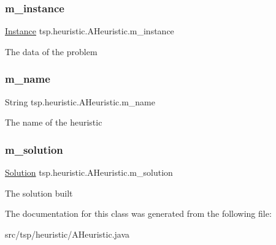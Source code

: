 \subsubsection{\texorpdfstring{m\+\_\+instance}{m\_instance}}
{\footnotesize\ttfamily \mbox{\hyperlink{classtsp_1_1_instance}{Instance}} tsp.\+heuristic.\+A\+Heuristic.\+m\+\_\+instance\hspace{0.3cm}{\ttfamily [protected]}}

The data of the problem \mbox{\label{classtsp_1_1heuristic_1_1_a_heuristic_a909754c0caf21979fa1d3c8bee42c000}} 
\subsubsection{\texorpdfstring{m\+\_\+name}{m\_name}}
{\footnotesize\ttfamily String tsp.\+heuristic.\+A\+Heuristic.\+m\+\_\+name\hspace{0.3cm}{\ttfamily [protected]}}

The name of the heuristic \mbox{\label{classtsp_1_1heuristic_1_1_a_heuristic_a43dda539b2ed7ca67172c97951a2bde9}} 
\subsubsection{\texorpdfstring{m\+\_\+solution}{m\_solution}}
{\footnotesize\ttfamily \mbox{\hyperlink{classtsp_1_1_solution}{Solution}} tsp.\+heuristic.\+A\+Heuristic.\+m\+\_\+solution\hspace{0.3cm}{\ttfamily [protected]}}

The solution built 

The documentation for this class was generated from the following file\+:\begin{DoxyCompactItemize}
\item 
src/tsp/heuristic/A\+Heuristic.\+java\end{DoxyCompactItemize}
